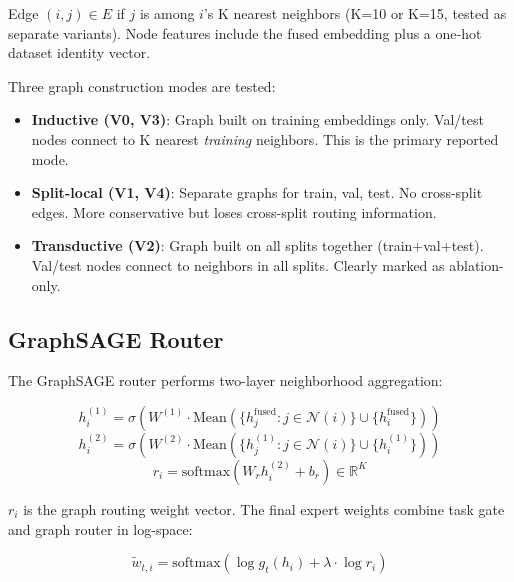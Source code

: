 \documentclass[12pt,oneside]{book}
\begin{document}
Edge $(i,j) \in E$ if $j$ is among $i$'s K nearest neighbors (K=10 or K=15, tested as separate variants). Node features include the fused embedding plus a one-hot dataset identity vector.

Three graph construction modes are tested:

\begin{itemize}
    \item \textbf{Inductive (V0, V3)}: Graph built on training embeddings only. Val/test nodes connect to K nearest \emph{training} neighbors. This is the primary reported mode.
    \item \textbf{Split-local (V1, V4)}: Separate graphs for train, val, test. No cross-split edges. More conservative but loses cross-split routing information.
    \item \textbf{Transductive (V2)}: Graph built on all splits together (train+val+test). Val/test nodes connect to neighbors in all splits. Clearly marked as ablation-only.
\end{itemize}



\subsection{GraphSAGE Router}
\label{sec:graph_router}

The GraphSAGE router performs two-layer neighborhood aggregation:

\begin{equation}
    h_i^{(1)} = \sigma(W^{(1)} \cdot \text{Mean}(\{h_j^{\text{fused}} : j \in \mathcal{N}(i)\} \cup \{h_i^{\text{fused}}\}))
\end{equation}
\begin{equation}
    h_i^{(2)} = \sigma(W^{(2)} \cdot \text{Mean}(\{h_j^{(1)} : j \in \mathcal{N}(i)\} \cup \{h_i^{(1)}\}))
\end{equation}
\begin{equation}
    r_i = \text{softmax}(W_r h_i^{(2)} + b_r) \in \mathbb{R}^K
\end{equation}

$r_i$ is the graph routing weight vector. The final expert weights combine task gate and graph router in log-space:

\begin{equation}
    \tilde{w}_{t,i} = \text{softmax}(\log g_t(h_i) + \lambda \cdot \log r_i)
\end{equation}
\end{document}
